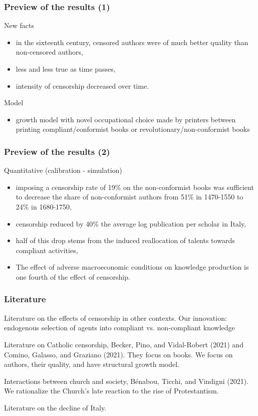 \documentclass[usepdftitle=false,aspectratio=169,xcolor=dvipsnames]{beamer}
\begin{document}
	\begin{frame}
\frametitle{Preview of the results (1)}

New facts
\begin{itemize}
\item in the sixteenth century,  censored authors were of much better quality than  non-censored authors,
\item less and less true as time passes,
\item  intensity of censorship decreased over time.
\end{itemize}

Model
\begin{itemize}
\item  growth model with novel occupational choice made by printers between printing compliant/conformist books or revolutionary/non-conformist books
\end{itemize}

	\end{frame}

	\begin{frame}
\frametitle{Preview of the results (2)}

Quantitative (calibration - simulation)
\begin{itemize}
\item  imposing a censorship rate of 19\% on the non-conformist books was sufficient to decrease the share of non-conformist authors from 51\% in 1470-1550 to 24\% in 1680-1750,
\item  censorship reduced by 40\% the average log publication per scholar in Italy,
\item  half of this drop stems from the induced reallocation of talents towards compliant activities,
\item The effect of adverse macroeconomic conditions on knowledge production is one fourth of  the effect of censorship.
\end{itemize}


	\end{frame}


	\begin{frame}
\frametitle{Literature}

Literature on the effects of censorship in other contexts.  Our innovation: endogenous selection of agents into compliant vs. non-compliant knowledge

Literature on  Catholic censorship,  Becker, Pino, and Vidal-Robert (2021) and
Comino, Galasso, and Graziano (2021). They focus on books. We focus on authors, their quality, and have structural growth model.

Interactions between church and society, B\'enabou, Ticchi, and Vindigni (2021).  We rationalize  the Church's late reaction to the rise of
Protestantism.

Literature on the decline of Italy.


	\end{frame}
\end{document}
